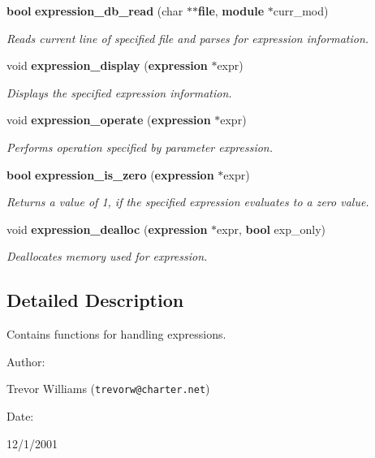 \begin{CompactItemize}
{\bf bool} {\bf expression\_\-db\_\-read} (char $\ast$$\ast${\bf file}, {\bf module} $\ast$curr\_\-mod)
\begin{CompactList}\small\item\em Reads current line of specified file and parses for expression information.\item\end{CompactList}\item 
void {\bf expression\_\-display} ({\bf expression} $\ast$expr)
\begin{CompactList}\small\item\em Displays the specified expression information.\item\end{CompactList}\item 
void {\bf expression\_\-operate} ({\bf expression} $\ast$expr)
\begin{CompactList}\small\item\em Performs operation specified by parameter expression.\item\end{CompactList}\item 
{\bf bool} {\bf expression\_\-is\_\-zero} ({\bf expression} $\ast$expr)
\begin{CompactList}\small\item\em Returns a value of 1, if the specified expression evaluates to a zero value.\item\end{CompactList}\item 
void {\bf expression\_\-dealloc} ({\bf expression} $\ast$expr, {\bf bool} exp\_\-only)
\begin{CompactList}\small\item\em Deallocates memory used for expression.\item\end{CompactList}\end{CompactItemize}


\subsection{Detailed Description}
Contains functions for handling expressions.



\begin{Desc}
\item[Author: ]\par
Trevor Williams ({\tt trevorw@charter.net}) \end{Desc}
\begin{Desc}
\item[Date: ]\par
12/1/2001\end{Desc}


